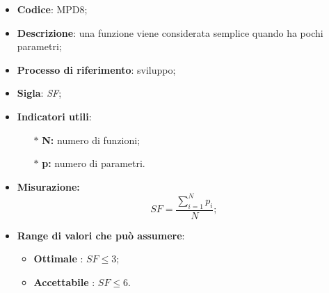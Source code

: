 \vspace{-1cm}
\begin{itemize}
	\item \textbf{Codice}: MPD8;
	\item \textbf{Descrizione}: una funzione viene considerata semplice quando ha pochi parametri;
	\item \textbf{Processo di riferimento}: sviluppo;
	\item \textbf{Sigla}: \textit{SF};
	\item \textbf{Indicatori utili}: 
		\begin{itemize}
		\item[$\ast$] \textbf{N:} numero di funzioni;
		\item[$\ast$] \textbf{p:} numero di parametri.
		\end{itemize}
	\item \textbf{Misurazione:} \[SF=\frac{\sum_{i=1}^{N} p_i}{N};\]
	\item \textbf{Range di valori che può assumere}: 
		\begin{itemize}
			\item \textbf{Ottimale} : $SF \leq 3$;
			\item \textbf{Accettabile} : $SF \leq 6$.
		\end{itemize}
\end{itemize}
